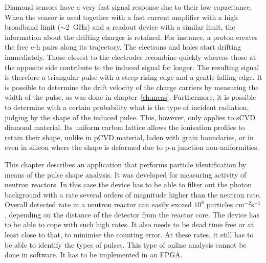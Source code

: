 
\label{ch:cur}

Diamond sensors have a very fast signal response due to their low capacitance. %
When the sensor is used together with a fast current amplifier with a high broadband limit ($\sim$2~GHz) and a readout device with a similar limit, the information about the drifting charges is retained. For instance, a proton creates the free e-h pairs along its trajectory. The electrons and holes start drifting immediately. Those closest to the electrodes recombine quickly whereas those at the opposite side contribute to the induced signal for longer.  The resulting signal is therefore a triangular pulse with a steep rising edge and a gentle falling edge. It is possible to determine the drift velocity of the charge carriers by measuring the width of the pulse, as was done in chapter~\ref{ch:meas}. Furthermore, it is possible to determine with a certain probability what is the type of incident radiation, judging by the shape of the induced pulse. This, however, only applies to sCVD diamond material. Its uniform carbon lattice allows the ionisation profiles to retain their shape, unlike in pCVD material, laden with grain boundaries, or in even in silicon where the shape is deformed due to p-n junction non-uniformities.

This chapter describes an application that performs particle identification by means of the pulse shape analysis. It was developed for measuring activity of neutron reactors. In this case the device has to be able to filter out the photon background with a rate several orders of magnitude higher than the neutron rate. Overall detected rate in a neutron reactor can easily exceed $10^8$ particles cm$^{-2}$s$^{-1}$, depending on the distance of the detector from the reactor core. The device has to be able to cope with such high rates. It also needs to be dead time free or at least close to that, to minimise the counting error. At these rates, it still has to be able to identify the types of pulses. This type of online analysis cannot be done in software. It has to be implemented in an FPGA.







